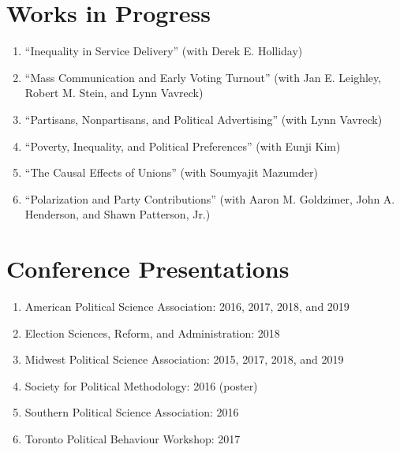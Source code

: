 \documentclass[11pt]{article}
\begin{document}
\section*{Works in Progress}

\begin{enumerate}[topsep = 0pt, itemsep = 1ex, partopsep  = 1ex, parsep = 1ex]

	\item[] ``Inequality in Service Delivery'' (with Derek E. Holliday)

	\item[] ``Mass Communication and Early Voting Turnout'' (with Jan E. Leighley, Robert M. Stein, and Lynn Vavreck)
	
	\item[] ``Partisans, Nonpartisans, and Political Advertising'' (with Lynn Vavreck) 
	
	\item[] ``Poverty, Inequality, and Political Preferences'' (with Eunji Kim)
	
	\item[] ``The Causal Effects of Unions'' (with Soumyajit Mazumder)
	
	\item[] ``Polarization and Party Contributions'' (with Aaron M. Goldzimer, John A. Henderson, and Shawn Patterson, Jr.)

\end{enumerate}

\section*{Conference Presentations}

\begin{enumerate}[topsep = 0pt, itemsep = 1ex, partopsep  = 1ex, parsep = 1ex]
	
	\item[] American Political Science Association: 2016, 2017, 2018, and 2019
	
	\item[] Election Sciences, Reform, and Administration: 2018 
	
	\item[] Midwest Political Science Association: 2015, 2017, 2018, and 2019
	
	\item[] Society for Political Methodology: 2016 (poster)
	
	\item[] Southern Political Science Association: 2016
	
	\item[] Toronto Political Behaviour Workshop: 2017
	
\end{enumerate}
\end{document}
